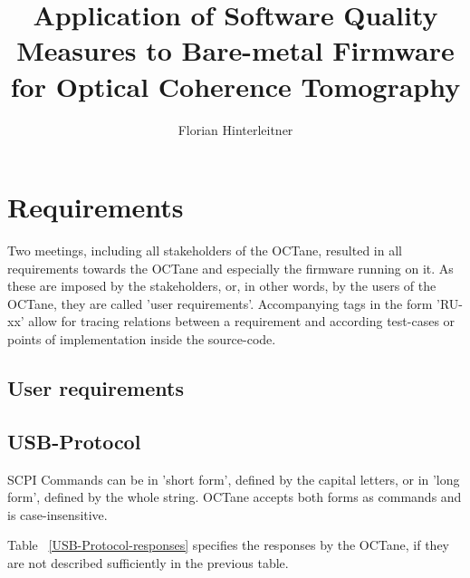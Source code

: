 \documentclass[master,english,smartquotes,apa]{hgbthesis}
\title{ Application of Software Quality Measures to Bare-metal Firmware for Optical Coherence Tomography}
\author{Florian Hinterleitner}
\begin{document}
\frontmatter                                   %
\maketitle

\tableofcontents

		
			
\mainmatter                                    %


% 

	
	\chapter{Requirements}
	\label{cha:Requirements}
		Two meetings, including all stakeholders of the OCTane, resulted in all requirements towards the OCTane and especially the firmware running on it. As these are imposed by the stakeholders, or, in other words, by the users of the OCTane, they are called 'user requirements'. Accompanying tags in the form 'RU-xx' allow for tracing relations between a requirement and according test-cases or points of implementation inside the source-code.
			\section{User requirements}
				
		\pagebreak
			\section{USB-Protocol}
		SCPI Commands can be in 'short form', defined by the capital letters, or in 'long form', defined by the whole string. OCTane accepts both forms as commands and is case-insensitive. \cite{scpi1993}

			{	\scriptsize
				
			}
			Table ~\ref{USB-Protocol-responses} specifies the responses by the OCTane, if they are not described sufficiently in the previous table.

			{	\scriptsize
				
			}
			
\end{document}
